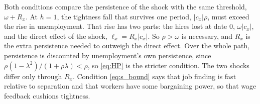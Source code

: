 \documentclass[authoryear, review, 12pt]{elsarticle}
\begin{document}
Both conditions compare the persistence of the shock with the same threshold,
$\omega+R_x$. At $h=1$, the tightness fall that survives one period, $\lvert c_x\rvert\rho$,
must exceed the rise in unemployment. That rise has two parts: the hires lost at date 0,
$\omega\lvert c_x\rvert$, and the direct effect of the shock, $\ell_x=R_x\lvert c_x\rvert$.
So $\rho>\omega$ is necessary, and $R_x$ is the extra persistence needed to outweigh the
direct effect. Over the whole path, persistence is discounted by unemployment's own
persistence, since $\rho(1-\lambda^2)/(1+\rho\lambda)<\rho$, so \eqref{eq:HP} is the
stricter condition. The two shocks differ only through $R_x$. Condition \eqref{eq:s_bound}
says that job finding is fast relative to separation and that workers have some
bargaining power, so that wage feedback cushions tightness.
\end{document}
